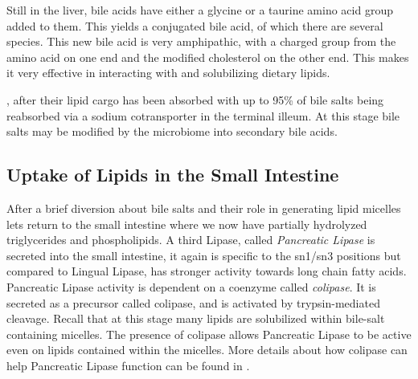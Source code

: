 \documentclass{tufte-handout}
\begin{document}
  Still in the liver, bile acids have either a glycine or a taurine amino acid group added to them.  This yields a conjugated bile acid, of which there are several species.  This new bile acid is very amphipathic, with a charged group from the amino acid on one end and the modified cholesterol on the other end.  This makes it very effective in interacting with and solubilizing dietary lipids.

, after their lipid cargo has been absorbed with up to 95\% of bile salts being reabsorbed via a sodium cotransporter in the terminal illeum.  At this stage bile salts may be modified by the microbiome into secondary bile acids.  

\subsection{Uptake of Lipids in the Small Intestine}

After a brief diversion about bile salts and their role in generating lipid micelles lets return to the small intestine where we now have partially hydrolyzed triglycerides and phospholipids.  A third Lipase, called \emph{Pancreatic Lipase} is secreted into the small intestine, it again is specific to the sn1/sn3 positions but compared to Lingual Lipase, has stronger activity towards long chain fatty acids\citep{Jensen1983}.  Pancreatic Lipase activity is dependent on a coenzyme called \emph{colipase}.  It is secreted as a precursor called colipase, and is activated by trypsin-mediated cleavage.  Recall that at this stage many lipids are solubilized within bile-salt containing micelles.  The presence of colipase allows Pancreatic Lipase to be active even on lipids contained within the micelles.  More details about how colipase can help Pancreatic Lipase function can be found in \citet{VanTilbeurgh1999}.
\end{document}
